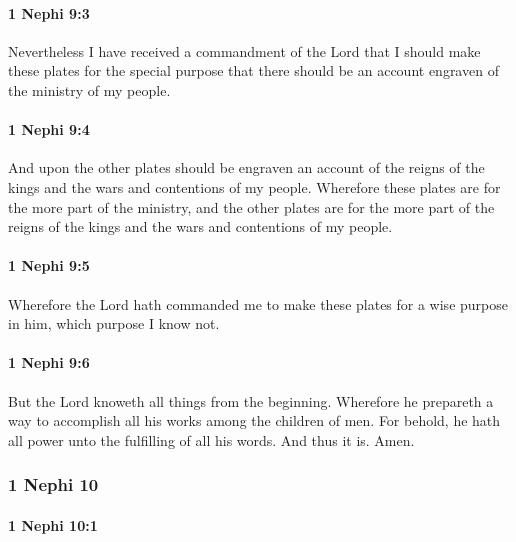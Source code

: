 		\paragraph{1 Nephi 9:3} %
			\label{1NEPHI-9-3}

			Nevertheless I have received a commandment of the Lord
			that I should make these plates for the special purpose
			that there should be an account engraven of the ministry of my people.

		\paragraph{1 Nephi 9:4} %
			\label{1NEPHI-9-4}

			And upon the other plates should be engraven
			an account of the reigns of the kings and the wars and contentions of my people.
			Wherefore these plates are for the more part of the ministry,
			and the other plates are for the more part of the reigns of the kings
			and the wars and contentions of my people.

		\paragraph{1 Nephi 9:5} %
			\label{1NEPHI-9-5}

			Wherefore the Lord hath commanded me to make these plates
			for a wise purpose in him, which purpose I know not.

		\paragraph{1 Nephi 9:6} %
			\label{1NEPHI-9-6}

			But the Lord knoweth all things from the beginning.
			Wherefore he prepareth a way
			to accomplish all his works among the children of men.
			For behold, he hath all power unto the fulfilling of all his words.
			And thus it is.
			Amen.

	\subsubsection{1 Nephi 10} %
		\label{1NEPHI-10}
		
		\paragraph{1 Nephi 10:1} %
			\label{1NEPHI-10-1}

